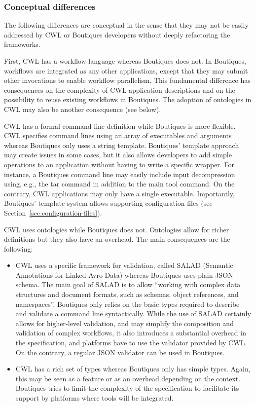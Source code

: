 \documentclass{article}
\newcommand{\boutiques}{Boutiques\xspace}
\begin{document}
\subsubsection{Conceptual differences}

The following differences are conceptual in the sense that they may
not be easily addressed by CWL or Boutiques developers without deeply
refactoring the frameworks.

First, CWL has a workflow language whereas \boutiques does not. In
\boutiques, workflows are integrated as any other applications, except
that they may submit other invocations to enable workflow
parallelism. This fundamental difference has consequences on the
complexity of CWL application descriptions and on the possibility to
reuse existing workflows in \boutiques. The adoption of ontologies in
CWL may also be another consequence (see below).

CWL has a formal command-line definition while \boutiques is more
flexible. CWL specifies command lines using an array of executables and
arguments whereas \boutiques only uses a string template. \boutiques'
template approach may create issues in some cases, but it also allows
developers to add simple operations to an application without having
to write a specific wrapper. For instance, a \boutiques command line
may easily include input decompression using, e.g., the tar command in
addition to the main tool command. On the contrary, CWL applications
may only have a single executable. Importantly, \boutiques' template
system allows supporting configuration files (see
Section~\ref{sec:configuration-files}).

CWL uses ontologies while \boutiques does not. Ontologies allow for
richer definitions but they also have an overhead. The main
consequences are the following:
\begin{itemize}
\item CWL uses a specific framework for
validation, called SALAD (Semantic Annotations for Linked Avro Data)
whereas Boutiques uses plain JSON schema. The main goal of SALAD is to
allow ``working with complex data structures and document formats, such
as schemas, object references, and namespaces''. \boutiques only relies
on the basic types required to describe and validate a command line
syntactically. While the use of SALAD certainly allows for
higher-level validation, and may simplify the composition and
validation of complex workflows, it also introduces a substantial
overhead in the specification, and platforms have to use the validator
provided by CWL. On the contrary, a regular JSON validator can be used in \boutiques.
\item  CWL has a rich set of types whereas \boutiques only has simple
types. Again, this may be seen as a feature or as an overhead
depending on the context. \boutiques tries to limit the complexity of
the specification to facilitate its support by platforms where tools
will be integrated.
\end{itemize}
\end{document}
